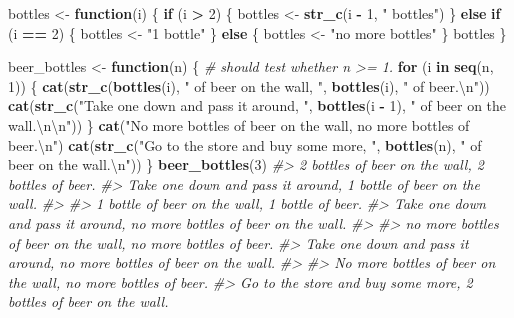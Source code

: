 \documentclass[]{book}
\newenvironment{Shaded}{\begin{snugshade}}{\end{snugshade}}
\newcommand{\CharTok}[1]{\textcolor[rgb]{0.31,0.60,0.02}{#1}}
\newcommand{\CommentTok}[1]{\textcolor[rgb]{0.56,0.35,0.01}{\textit{#1}}}
\newcommand{\ControlFlowTok}[1]{\textcolor[rgb]{0.13,0.29,0.53}{\textbf{#1}}}
\newcommand{\DecValTok}[1]{\textcolor[rgb]{0.00,0.00,0.81}{#1}}
\newcommand{\KeywordTok}[1]{\textcolor[rgb]{0.13,0.29,0.53}{\textbf{#1}}}
\newcommand{\NormalTok}[1]{#1}
\newcommand{\OperatorTok}[1]{\textcolor[rgb]{0.81,0.36,0.00}{\textbf{#1}}}
\newcommand{\StringTok}[1]{\textcolor[rgb]{0.31,0.60,0.02}{#1}}
\theoremstyle{plain}
\theoremstyle{remark}
\theoremstyle{definition}
\theoremstyle{definition}
\theoremstyle{definition}
\theoremstyle{remark}
\begin{document}
\begin{Shaded}
\begin{Highlighting}[]
\NormalTok{bottles <-}\StringTok{ }\ControlFlowTok{function}\NormalTok{(i) \{}
  \ControlFlowTok{if}\NormalTok{ (i }\OperatorTok{>}\StringTok{ }\DecValTok{2}\NormalTok{) \{}
\NormalTok{   bottles <-}\StringTok{ }\KeywordTok{str_c}\NormalTok{(i }\OperatorTok{-}\StringTok{ }\DecValTok{1}\NormalTok{, }\StringTok{" bottles"}\NormalTok{)}
\NormalTok{  \} }\ControlFlowTok{else} \ControlFlowTok{if}\NormalTok{ (i }\OperatorTok{==}\StringTok{ }\DecValTok{2}\NormalTok{) \{}
\NormalTok{   bottles <-}\StringTok{ "1 bottle"}
\NormalTok{  \} }\ControlFlowTok{else}\NormalTok{ \{}
\NormalTok{   bottles <-}\StringTok{ "no more bottles"}
\NormalTok{  \}}
\NormalTok{  bottles}
\NormalTok{\}}

\NormalTok{beer_bottles <-}\StringTok{ }\ControlFlowTok{function}\NormalTok{(n) \{}
  \CommentTok{# should test whether n >= 1.}
  \ControlFlowTok{for}\NormalTok{ (i }\ControlFlowTok{in} \KeywordTok{seq}\NormalTok{(n, }\DecValTok{1}\NormalTok{)) \{}
     \KeywordTok{cat}\NormalTok{(}\KeywordTok{str_c}\NormalTok{(}\KeywordTok{bottles}\NormalTok{(i), }\StringTok{" of beer on the wall, "}\NormalTok{, }\KeywordTok{bottles}\NormalTok{(i), }\StringTok{" of beer.}\CharTok{\textbackslash{}n}\StringTok{"}\NormalTok{))}
     \KeywordTok{cat}\NormalTok{(}\KeywordTok{str_c}\NormalTok{(}\StringTok{"Take one down and pass it around, "}\NormalTok{, }\KeywordTok{bottles}\NormalTok{(i }\OperatorTok{-}\StringTok{ }\DecValTok{1}\NormalTok{),}
                \StringTok{" of beer on the wall.}\CharTok{\textbackslash{}n\textbackslash{}n}\StringTok{"}\NormalTok{))}
\NormalTok{  \}}
  \KeywordTok{cat}\NormalTok{(}\StringTok{"No more bottles of beer on the wall, no more bottles of beer.}\CharTok{\textbackslash{}n}\StringTok{"}\NormalTok{)}
  \KeywordTok{cat}\NormalTok{(}\KeywordTok{str_c}\NormalTok{(}\StringTok{"Go to the store and buy some more, "}\NormalTok{, }\KeywordTok{bottles}\NormalTok{(n), }\StringTok{" of beer on the wall.}\CharTok{\textbackslash{}n}\StringTok{"}\NormalTok{))}
\NormalTok{\}}
\KeywordTok{beer_bottles}\NormalTok{(}\DecValTok{3}\NormalTok{)}
\CommentTok{#> 2 bottles of beer on the wall, 2 bottles of beer.}
\CommentTok{#> Take one down and pass it around, 1 bottle of beer on the wall.}
\CommentTok{#> }
\CommentTok{#> 1 bottle of beer on the wall, 1 bottle of beer.}
\CommentTok{#> Take one down and pass it around, no more bottles of beer on the wall.}
\CommentTok{#> }
\CommentTok{#> no more bottles of beer on the wall, no more bottles of beer.}
\CommentTok{#> Take one down and pass it around, no more bottles of beer on the wall.}
\CommentTok{#> }
\CommentTok{#> No more bottles of beer on the wall, no more bottles of beer.}
\CommentTok{#> Go to the store and buy some more, 2 bottles of beer on the wall.}
\end{Highlighting}
\end{Shaded}
\end{document}
